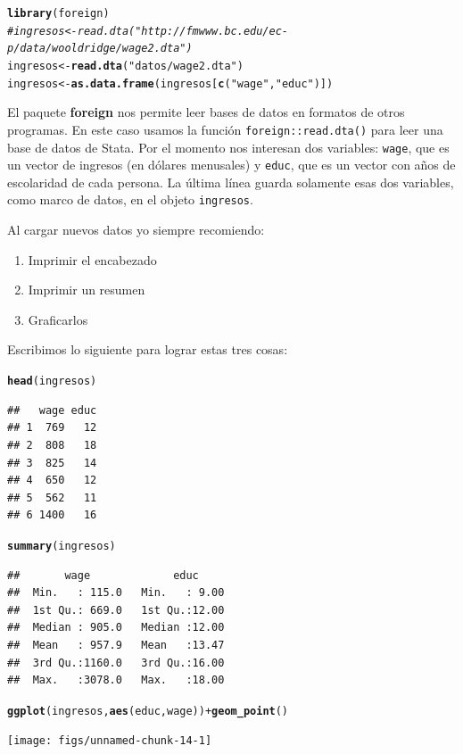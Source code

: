 \documentclass{report}\usepackage[]{graphicx}\usepackage[]{color}
\makeatletter
\newcommand{\hlstr}[1]{\textcolor[rgb]{0.192,0.494,0.8}{#1}}%
\newcommand{\hlcom}[1]{\textcolor[rgb]{0.678,0.584,0.686}{\textit{#1}}}%
\newcommand{\hlopt}[1]{\textcolor[rgb]{0,0,0}{#1}}%
\newcommand{\hlstd}[1]{\textcolor[rgb]{0.345,0.345,0.345}{#1}}%
\newcommand{\hlkwb}[1]{\textcolor[rgb]{0.69,0.353,0.396}{#1}}%
\newcommand{\hlkwd}[1]{\textcolor[rgb]{0.737,0.353,0.396}{\textbf{#1}}}%
\newenvironment{kframe}{%
 \def\at@end@of@kframe{}%
 \ifinner\ifhmode%
  \def\at@end@of@kframe{\end{minipage}}%
  \begin{minipage}{\columnwidth}%
 \fi\fi%
 \def\FrameCommand##1{\hskip\@totalleftmargin \hskip-\fboxsep
 \colorbox{shadecolor}{##1}\hskip-\fboxsep
     \hskip-\linewidth \hskip-\@totalleftmargin \hskip\columnwidth}%
 \MakeFramed {\advance\hsize-\width
   \@totalleftmargin\z@ \linewidth\hsize
   \@setminipage}}%
 {\par\unskip\endMakeFramed%
 \at@end@of@kframe}
\newenvironment{knitrout}{}{} %
\newcommand*{\paq}[1]{\textbf{#1}\index{#1@\textbf{#1}}}
\makeatother
\begin{document}
\begin{knitrout}
\color{fgcolor}\begin{kframe}
\begin{alltt}
\hlkwd{library}\hlstd{(foreign)}
\hlcom{#ingresos <- read.dta("http://fmwww.bc.edu/ec-p/data/wooldridge/wage2.dta")}
\hlstd{ingresos} \hlkwb{<-} \hlkwd{read.dta}\hlstd{(}\hlstr{"datos/wage2.dta"}\hlstd{)}
\hlstd{ingresos} \hlkwb{<-} \hlkwd{as.data.frame}\hlstd{(ingresos[}\hlkwd{c}\hlstd{(}\hlstr{"wage"}\hlstd{,}\hlstr{"educ"}\hlstd{)])}
\end{alltt}
\end{kframe}
\end{knitrout}

El paquete \paq{foreign} nos permite leer bases de datos en formatos de otros programas. En este caso usamos la función \verb|foreign::read.dta()| para leer una base de datos de Stata.
Por el momento nos interesan dos variables: \verb|wage|, que es un vector de ingresos (en dólares menusales) y \verb|educ|, que es un vector con años de escolaridad de cada persona. La última línea guarda solamente esas dos variables, como marco de datos, en el objeto \verb|ingresos|.

Al cargar nuevos datos yo siempre recomiendo:
\begin{enumerate}
\item Imprimir el encabezado
\item Imprimir un resumen
\item Graficarlos
\end{enumerate}

Escribimos lo siguiente para lograr estas tres cosas:

\begin{knitrout}
\color{fgcolor}\begin{kframe}
\begin{alltt}
\hlkwd{head}\hlstd{(ingresos)}
\end{alltt}
\begin{verbatim}
##   wage educ
## 1  769   12
## 2  808   18
## 3  825   14
## 4  650   12
## 5  562   11
## 6 1400   16
\end{verbatim}
\begin{alltt}
\hlkwd{summary}\hlstd{(ingresos)}
\end{alltt}
\begin{verbatim}
##       wage             educ      
##  Min.   : 115.0   Min.   : 9.00  
##  1st Qu.: 669.0   1st Qu.:12.00  
##  Median : 905.0   Median :12.00  
##  Mean   : 957.9   Mean   :13.47  
##  3rd Qu.:1160.0   3rd Qu.:16.00  
##  Max.   :3078.0   Max.   :18.00
\end{verbatim}
\begin{alltt}
\hlkwd{ggplot}\hlstd{(ingresos,} \hlkwd{aes}\hlstd{(educ, wage))} \hlopt{+} \hlkwd{geom_point}\hlstd{()}
\end{alltt}
\end{kframe}

{\centering \texttt{[image: figs/unnamed-chunk-14-1]} 

}



\end{knitrout}
\end{document}

